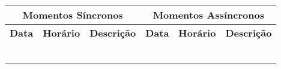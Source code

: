 \documentclass[12pt, a4paper, oneside]{book}
\begin{document}
\begin{table}[]
	\begin{tabular}{llllll}
		\hline
		\multicolumn{3}{c|}{\textbf{Momentos Síncronos}}                                                                                        & \multicolumn{3}{c}{\textbf{Momentos   Assíncronos}}                                                                                   \\ \hline
		\multicolumn{1}{c|}{\textbf{Data}}        & \multicolumn{1}{c|}{\textbf{Horário}}       & \multicolumn{1}{c|}{\textbf{Descrição}}       & \multicolumn{1}{c|}{\textbf{Data}}        & \multicolumn{1}{c|}{\textbf{Horário}}       & \multicolumn{1}{c}{\textbf{Descrição}}       \\ \hline
		\multicolumn{1}{l|}{}                     & \multicolumn{1}{l|}{}                       & \multicolumn{1}{l|}{}                         & \multicolumn{1}{l|}{}                     & \multicolumn{1}{l|}{}                       &                                              \\ \hline
		\multicolumn{1}{l|}{}                     & \multicolumn{1}{l|}{}                       & \multicolumn{1}{l|}{}                         & \multicolumn{1}{l|}{}                     & \multicolumn{1}{l|}{}                       &                                              \\ \hline
		\multicolumn{1}{l|}{}                     & \multicolumn{1}{l|}{}                       & \multicolumn{1}{l|}{}                         & \multicolumn{1}{l|}{}                     & \multicolumn{1}{l|}{}                       &                                              \\ \hline
		\multicolumn{1}{l|}{}                     & \multicolumn{1}{l|}{}                       & \multicolumn{1}{l|}{}                         & \multicolumn{1}{l|}{}                     & \multicolumn{1}{l|}{}                       &                                              \\ \hline
		\multicolumn{1}{l|}{}                     & \multicolumn{1}{l|}{}                       & \multicolumn{1}{l|}{}                         & \multicolumn{1}{l|}{}                     & \multicolumn{1}{l|}{}                       &                                              \\ \hline
		\multicolumn{1}{l|}{}                     & \multicolumn{1}{l|}{}                       & \multicolumn{1}{l|}{}                         & \multicolumn{1}{l|}{}                     & \multicolumn{1}{l|}{}                       &                                              \\ \hline

\end{tabular}
\end{table}
\end{document}
